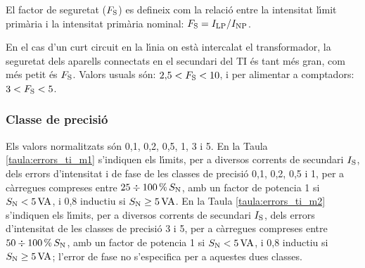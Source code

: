  El factor de seguretat
($F_\mathrm{S}$) es defineix com la relaci\'{o} entre la intensitat l\'{\i}mit prim\`{a}ria
i la intensitat prim\`{a}ria nominal: $F_\mathrm{S} = I_\mathrm{LP} / I_\mathrm{NP}$.

En el cas d'un curt circuit en la l\'{\i}nia on est\`{a} intercalat el
transformador, la seguretat dels aparells connectats en el secundari
del TI \'{e}s tant m\'{e}s gran, com m\'{e}s petit \'{e}s  $F_\mathrm{S}$. Valors usuals
s\'{o}n:  $2{,}5<F_\mathrm{S}<10$, i per alimentar a comptadors:
$3<F_\mathrm{S}<5$.

\subsubsection{Classe de precisi\'{o}}

 Els valors normalitzats s\'{o}n
0,1, 0,2, 0,5, 1, 3 i 5. En la Taula \vref{taula:errors_ti_m1}
s'indiquen els l\'{\i}mits, per a diversos corrents de secundari
$I_\mathrm{S}$, dels errors d'intensitat i  de fase de les classes de
precisi\'{o} 0,1, 0,2, 0,5 i 1,  per a c\`{a}rregues compreses entre $25
\div 100\mathrm{\,\%} \,S_\mathrm{N}$, amb un factor de potencia 1 si
$S_\mathrm{N}<5\mathrm{\,VA}$, i 0,8 inductiu si $S_\mathrm{N}\geq 5\mathrm{\,VA}$.
En la Taula \vref{taula:errors_ti_m2} s'indiquen els l\'{\i}mits, per a
diversos corrents de secundari $I_\mathrm{S}$, dels errors d'intensitat
de les classes de precisi\'{o} 3 i 5,  per a  c\`{a}rregues compreses entre
$50 \div 100\mathrm{\,\%} \,S_\mathrm{N}$, amb un factor de potencia 1 si
$S_\mathrm{N}<5\mathrm{\,VA}$, i 0,8 inductiu  si $S_\mathrm{N}\geq 5\mathrm{\,VA}$;
l'error de fase no s'especifica per a aquestes dues classes.

